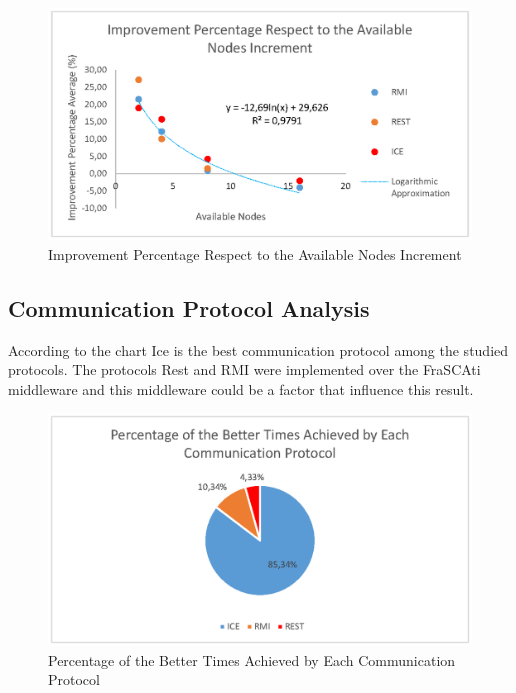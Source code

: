 	\begin{figure}
		\centering
		\includegraphics[trim=0.5cm 19cm 1cm 1cm]{fig/availableNodes.eps}
		\caption{Improvement Percentage Respect to the Available Nodes Increment}
		\label{fig:availableNodes}
	\end{figure}

\subsection{Communication Protocol Analysis}
According to the chart Ice is the best communication protocol among the studied protocols. The protocols Rest and RMI were implemented over the FraSCAti middleware and this middleware could be a factor that influence this result. 
\begin{figure}
	\centering
	\includegraphics[trim=0.5cm 19cm 1cm 1cm]{fig/betterTimesCommunicationProtocol.eps}
	\caption{Percentage of the Better Times Achieved by Each Communication Protocol}
	\label{fig:betterTimesCommunicationProtocol}
\end{figure}

